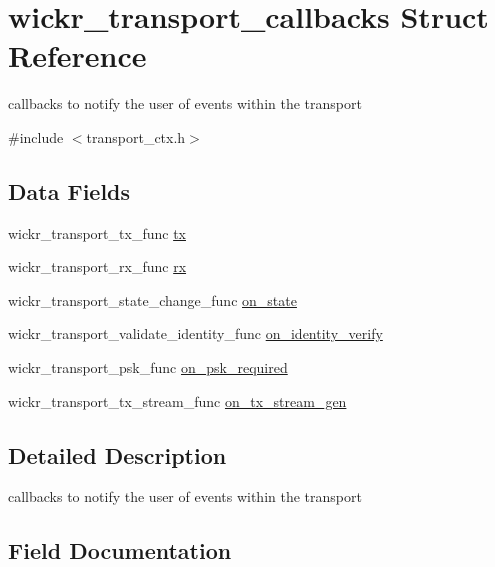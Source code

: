 \hypertarget{structwickr__transport__callbacks}{}\section{wickr\+\_\+transport\+\_\+callbacks Struct Reference}
\label{structwickr__transport__callbacks}


callbacks to notify the user of events within the transport  




{\ttfamily \#include $<$transport\+\_\+ctx.\+h$>$}

\subsection*{Data Fields}
\begin{DoxyCompactItemize}
\item 
wickr\+\_\+transport\+\_\+tx\+\_\+func \mbox{\hyperlink{structwickr__transport__callbacks_a06c4b21b847c00e92373cf1402e1cb9d}{tx}}
\item 
wickr\+\_\+transport\+\_\+rx\+\_\+func \mbox{\hyperlink{structwickr__transport__callbacks_a5d523402980ac09fdf52aa4824f8e9f7}{rx}}
\item 
wickr\+\_\+transport\+\_\+state\+\_\+change\+\_\+func \mbox{\hyperlink{structwickr__transport__callbacks_afef0716506b88885c57fda652500b3da}{on\+\_\+state}}
\item 
wickr\+\_\+transport\+\_\+validate\+\_\+identity\+\_\+func \mbox{\hyperlink{structwickr__transport__callbacks_ab1afc16797b1bb30dde87936a97f682e}{on\+\_\+identity\+\_\+verify}}
\item 
wickr\+\_\+transport\+\_\+psk\+\_\+func \mbox{\hyperlink{structwickr__transport__callbacks_af01227bfe19f056de55669d79ed7c120}{on\+\_\+psk\+\_\+required}}
\item 
wickr\+\_\+transport\+\_\+tx\+\_\+stream\+\_\+func \mbox{\hyperlink{structwickr__transport__callbacks_a1b6ee026d404a5b267e0c680dc9c2337}{on\+\_\+tx\+\_\+stream\+\_\+gen}}
\end{DoxyCompactItemize}


\subsection{Detailed Description}
callbacks to notify the user of events within the transport 

\subsection{Field Documentation}
\mbox{\label{structwickr__transport__callbacks_ab1afc16797b1bb30dde87936a97f682e}} 
